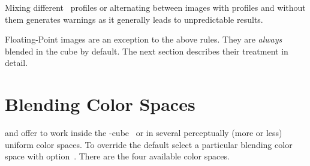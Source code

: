 Mixing different ~profiles or alternating between images with profiles and without
them generates warnings as it generally leads to unpredictable results.

Floating-Point images are an exception to the above rules.  They are \emph{always} blended in
the  cube by default.  The next section describes their treatment in detail.


\section[Blending Color Spaces]{\label{sec:blending-color-spaces}%
  Blending Color Spaces}

\App{} and \OtherApp{} offer to work inside the -cube~ or in
several perceptually (more or less) uniform color spaces.  To override the default select a
particular blending color space with
option~.  There are the four
available color spaces.

